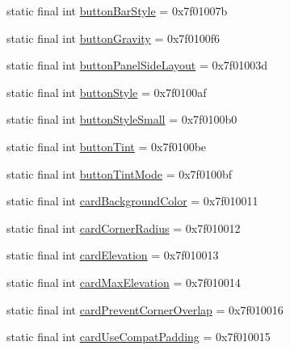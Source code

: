 \begin{CompactItemize}
\item 
static final int \hyperlink{classandroid_1_1support_1_1v7_1_1recyclerview_1_1_r_1_1attr_3ac0a038c4f5904a666e444dd191c9b7}{buttonBarStyle} = 0x7f01007b
\item 
static final int \hyperlink{classandroid_1_1support_1_1v7_1_1recyclerview_1_1_r_1_1attr_ed7410813c5e6703bec9b48e516e9e26}{buttonGravity} = 0x7f0100f6
\item 
static final int \hyperlink{classandroid_1_1support_1_1v7_1_1recyclerview_1_1_r_1_1attr_d507a4d2ea511507ea8dbe10f603bdcb}{buttonPanelSideLayout} = 0x7f01003d
\item 
static final int \hyperlink{classandroid_1_1support_1_1v7_1_1recyclerview_1_1_r_1_1attr_db7a4b3349200950967057532627746c}{buttonStyle} = 0x7f0100af
\item 
static final int \hyperlink{classandroid_1_1support_1_1v7_1_1recyclerview_1_1_r_1_1attr_1e8ff13c046bffdad4213ac27f3aff9b}{buttonStyleSmall} = 0x7f0100b0
\item 
static final int \hyperlink{classandroid_1_1support_1_1v7_1_1recyclerview_1_1_r_1_1attr_a0838e9a0f1bec810b071d565fb924ee}{buttonTint} = 0x7f0100be
\item 
static final int \hyperlink{classandroid_1_1support_1_1v7_1_1recyclerview_1_1_r_1_1attr_b9a92b4c7d5e17b7c9dee6f187ba3c73}{buttonTintMode} = 0x7f0100bf
\item 
static final int \hyperlink{classandroid_1_1support_1_1v7_1_1recyclerview_1_1_r_1_1attr_5c6478bbaeb845753019e4ee892f0dc9}{cardBackgroundColor} = 0x7f010011
\item 
static final int \hyperlink{classandroid_1_1support_1_1v7_1_1recyclerview_1_1_r_1_1attr_912b0bd78f18936e61164506ef0ecc6b}{cardCornerRadius} = 0x7f010012
\item 
static final int \hyperlink{classandroid_1_1support_1_1v7_1_1recyclerview_1_1_r_1_1attr_c07c7c3193bb07f00406b6f8521ceaf4}{cardElevation} = 0x7f010013
\item 
static final int \hyperlink{classandroid_1_1support_1_1v7_1_1recyclerview_1_1_r_1_1attr_e709df9e3c1a3e38a5790b824a431225}{cardMaxElevation} = 0x7f010014
\item 
static final int \hyperlink{classandroid_1_1support_1_1v7_1_1recyclerview_1_1_r_1_1attr_ee0cce36e845e4488999245b863ea517}{cardPreventCornerOverlap} = 0x7f010016
\item 
static final int \hyperlink{classandroid_1_1support_1_1v7_1_1recyclerview_1_1_r_1_1attr_ce58c98c79a385be4560396228edfab5}{cardUseCompatPadding} = 0x7f010015
\item 

\end{CompactItemize}
